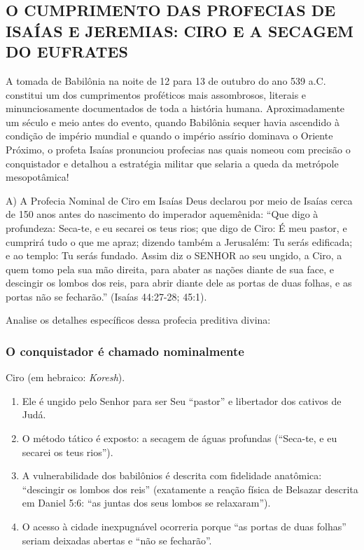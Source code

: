 \subsection{O CUMPRIMENTO DAS PROFECIAS DE ISAÍAS E JEREMIAS: CIRO E A SECAGEM DO EUFRATES}


A tomada de Babilônia na noite de 12 para 13 de outubro do ano 539 a.C. constitui um dos cumprimentos proféticos mais assombrosos, literais e minunciosamente documentados de toda a história humana. Aproximadamente um século e meio antes do evento, quando Babilônia sequer havia ascendido à condição de império mundial e quando o império assírio dominava o Oriente Próximo, o profeta Isaías pronunciou profecias nas quais nomeou com precisão o conquistador e detalhou a estratégia militar que selaria a queda da metrópole mesopotâmica!

A) A Profecia Nominal de Ciro em Isaías
Deus declarou por meio de Isaías cerca de 150 anos antes do nascimento do imperador aquemênida:
``Que digo à profundeza: Seca-te, e eu secarei os teus rios; que digo de Ciro: É meu pastor, e cumprirá tudo o que me apraz; dizendo também a Jerusalém: Tu serás edificada; e ao templo: Tu serás fundado. Assim diz o SENHOR ao seu ungido, a Ciro, a quem tomo pela sua mão direita, para abater as nações diante de sua face, e descingir os lombos dos reis, para abrir diante dele as portas de duas folhas, e as portas não se fecharão.'' (Isaías 44:27-28; 45:1).

Analise os detalhes específicos dessa profecia preditiva divina:

\subsubsection*{O conquistador é chamado nominalmente}
Ciro (em hebraico: \textit{Koresh}).
\begin{enumerate}
  \item Ele é ungido pelo Senhor para ser Seu ``pastor'' e libertador dos cativos de Judá.
  \item O método tático é exposto: a secagem de águas profundas (``Seca-te, e eu secarei os teus rios'').
  \item A vulnerabilidade dos babilônios é descrita com fidelidade anatômica: ``descingir os lombos dos reis'' (exatamente a reação física de Belsazar descrita em Daniel 5:6: ``as juntas dos seus lombos se relaxaram'').
  \item O acesso à cidade inexpugnável ocorreria porque ``as portas de duas folhas'' seriam deixadas abertas e ``não se fecharão''.
\end{enumerate}


